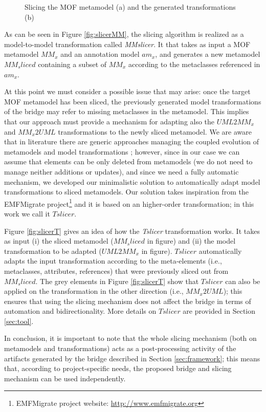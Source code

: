 \begin{figure}
  \caption{Slicing the MOF metamodel (a) and the generated transformations (b)}
  \label{fig:animals}
\end{figure}
%
As can be seen in Figure \ref{fig:slicerMM}, the slicing algorithm is realized as a model-to-model transformation called \textit{MMslicer}.
It that takes as input a MOF metamodel $MM_x$ and an annotation model $am_x$, and generates a new metamodel $MM_sliced$ containing 
a subset of $MM_x$ according to the metaclasses referenced in $am_x$.

At this point we must consider a possible issue that may arise: once the target MOF metamodel has been sliced, the
previously generated model transformations of the bridge may refer to missing metaclasses in the metamodel.
This implies that our approach must provide a mechanism for adapting also the $UML2MM_x$ and $MM_x2UML$ transformations
to the newly sliced metamodel.
We are aware that in literature there are generic approaches managing the coupled evolution of metamodels and model transformations
\cite{TransEvolution}; however, since in our case we can assume that elements
can be only deleted from metamodels (we do not need to manage neither additions or updates), and since we need a fully automatic mechanism, we developed our minimalistic solution to automatically adapt model transformations to sliced metamodels.
Our solution takes inspiration from the EMFMigrate project\footnote{EMFMigrate project website: \small{\url{http://www.emfmigrate.org}}}
and it is based on an higher-order transformation; in this work we call it $Tslicer$.

Figure \ref{fig:slicerT} gives an idea of how the \textit{Tslicer} transformation works. It takes as input (i) the sliced metamodel
($MM_sliced$ in figure) and (ii) the model transformation to be adapted ($UML2MM_x$ in figure). $Tslicer$ automatically adapts the input transformation according to the meta-elements (i.e., metaclasses, attributes, references) 
that were previously sliced out from $MM_sliced$. The grey elements in Figure \ref{fig:slicerT} show that $Tslicer$ can also be
applied on the transformation in the other direction (i.e., $MM_x2UML$); this ensures that using the slicing mechanism does not affect
the bridge in terms of automation and bidirectionality. More details on $Tslicer$ are provided in Section \ref{sec:tool}.

In conclusion, it is important to note that the whole slicing mechanism (both on metamodels and transformations) 
acts as a post-processing activity of the artifacts generated by the bridge described in Section \ref{sec:framework}; this means that, according to project-specific needs, the proposed bridge and slicing mechanism can be used independently.


